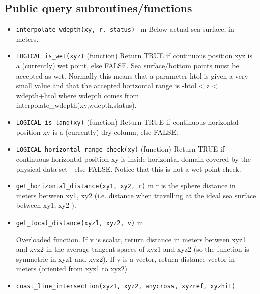 \subsection{Public query subroutines/functions}

\begin{itemize}

 \item {\tt interpolate\_wdepth(xy, r, status) } m \newline  Below actual sea surface, in meters.    
 
 \item {\tt LOGICAL is\_wet(xyz)} (function) Return TRUE if continuous position 
         xyz is a (currently) wet point,  else FALSE.
         Sea surface/bottom points must be accepted as wet. 
         Normally this means that a parameter htol is given a very small value and that
         the accepted horizontal range is  -htol < z < wdepth+htol
         where wdepth comes from interpolate\_wdepth(xy,wdepth,status).

 \item {\tt LOGICAL is\_land(xy)} (function) Return TRUE if continuous horizontal 
         position xy is a (currently) dry column, else FALSE.

 \item {\tt LOGICAL horizontal\_range\_check(xy)} (function) Return TRUE if continuous horizontal 
        position xy is inside horizontal domain covered by the physical data set - else FALSE.
        Notice that this is not a wet point check.

 \item {\tt get\_horizontal\_distance(xy1, xy2, r)} m \newline
   r is the sphere distance in meters between xy1, xy2 (i.e. distance when travelling at the ideal sea surface
   between xy1, xy2 ).

 \item {\tt get\_local\_distance(xyz1, xyz2, v)}    m \newline

   Overloaded function.
   If v is scalar, return distance in meters between xyz1 and xyz2 in the average tangent spaces of xyz1 and xyz2
   (so the function is symmetric in xyz1 and xyz2).
   If v is a vector, return distance vector in meters (oriented from xyz1 to xyz2)
 
 \item {\tt coast\_line\_intersection(xyz1, xyz2, anycross, xyzref, xyzhit)} 
 

\end{itemize}
